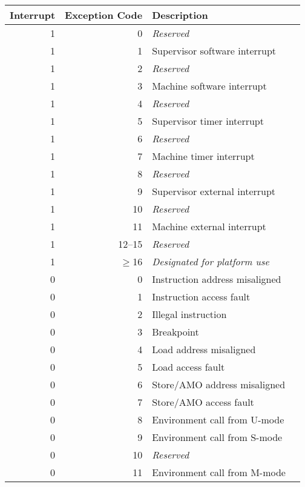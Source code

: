 \begin{table*}[htbp]
\begin{center}
\begin{tabular}{|r|r|l|l|}
  \hline
  Interrupt & Exception Code  & Description \\
  \hline
  1         & 0               & {\em Reserved} \\
  1         & 1               & Supervisor software interrupt \\
  1         & 2               & {\em Reserved} \\
  1         & 3               & Machine software interrupt \\ \hline
  1         & 4               & {\em Reserved} \\
  1         & 5               & Supervisor timer interrupt \\
  1         & 6               & {\em Reserved} \\
  1         & 7               & Machine timer interrupt \\ \hline
  1         & 8               & {\em Reserved} \\
  1         & 9               & Supervisor external interrupt \\
  1         & 10              & {\em Reserved} \\
  1         & 11              & Machine external interrupt \\ \hline
  1         & 12--15          & {\em Reserved} \\
  1         & $\ge$16         & {\em Designated for platform use} \\ \hline
  0         & 0               & Instruction address misaligned \\
  0         & 1               & Instruction access fault \\
  0         & 2               & Illegal instruction \\
  0         & 3               & Breakpoint \\
  0         & 4               & Load address misaligned \\
  0         & 5               & Load access fault \\
  0         & 6               & Store/AMO address misaligned \\
  0         & 7               & Store/AMO access fault \\
  0         & 8               & Environment call from U-mode\\
  0         & 9               & Environment call from S-mode \\
  0         & 10              & {\em Reserved} \\
  0         & 11              & Environment call from M-mode \\

\end{tabular}
\end{center}
\end{table*}
